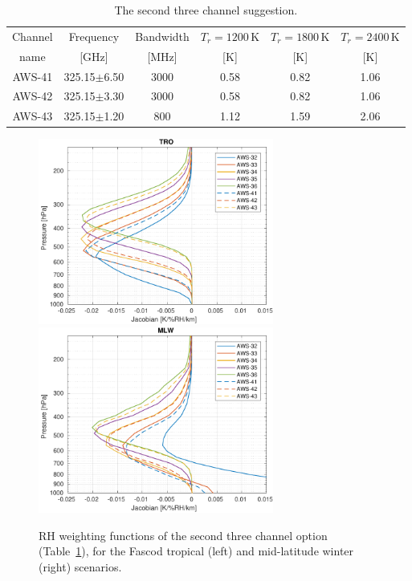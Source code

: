 \documentclass[12pt]{article}
\begin{document}
\begin{table}[!p]
  \centering  
  \begin{tabular}[c]{c|c|c|ccc}
    Channel & Frequency   & Bandwidth & $T_r=1200$\,K
    & $T_r=1800$\,K & $T_r=2400$\,K\\
    name    & [GHz] &  [MHz] & [K]  & [K] & [K]\\
    \hline
    AWS-41  & 325.15$\pm$6.50 & 3000  & 0.58 & 0.82 & 1.06\\
    AWS-42  & 325.15$\pm$3.30 & 3000  & 0.58 & 0.82 & 1.06\\
    AWS-43  & 325.15$\pm$1.20 & \phantom{0}800 & 1.12 & 1.59 & 2.06\\
    \hline
  \end{tabular}
  \caption{The second three channel suggestion.}
  \label{tab:chs:3b}
\end{table}


\begin{figure}[!p]
  \centering
  \includegraphics[height=61mm]{fascod_3bchopt_tro}\hspace{5mm}%
  \includegraphics[clip,trim=43 0 0 0,height=61mm]{fascod_3bchopt_mlw}
  \caption{RH weighting functions of the second three channel option
    (Table~\ref{tab:chs:3b}), for the Fascod tropical (left) and mid-latitude
    winter (right) scenarios.}
  \label{fig:3bch:prel}
\end{figure}
\end{document}
